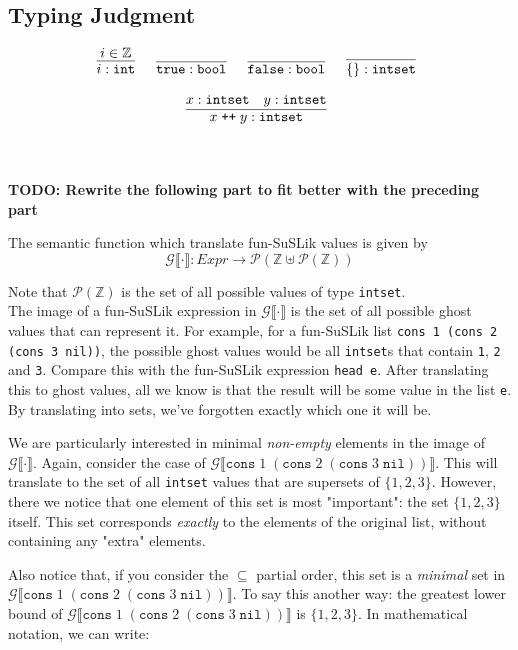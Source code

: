 \documentclass[10pt]{article}
\newcommand{\ttt}[1]{\texttt{#1}}
\newcommand{\ra}{\ensuremath{\rightarrow}}
\newcommand{\cons}{\ttt{cons}}
\newcommand{\nil}{\ttt{nil}}
\newcommand{\intS}{\ttt{int}}
\newcommand{\intset}{\ttt{intset}}
\newcommand{\bool}{\ttt{bool}}
\newcommand{\true}{\ttt{true}}
\newcommand{\false}{\ttt{false}}
\newcommand{\labinfer} [3] [] {\infer[{\small\textsc{#1}}]{#2}{#3}}
\newcommand{\sem} [1] {\llbracket#1\rrbracket}
\newcommand{\Gsem} [1] {\mathcal{G}\sem{#1}}
\begin{document}
\subsection{Typing Judgment}
\[
  \begin{array}{cc}
    \labinfer{i : \intS}{i \in \mathbb{Z}}
    ~~~
    \labinfer{\true : \bool}{}
    ~~~
    \labinfer{\false : \bool}{}
    ~~~
    \labinfer{\{\} : \intset}{}
    \\\\
    \labinfer{x\; \ttt{++}\; y : \intset}{x : \intset & y : \intset}

  \end{array}
\]

~\\\\
\textbf{TODO: Rewrite the following part to fit better with the preceding part}

\noindent
The semantic function which translate fun-SuSLik values is given by
\[
  \Gsem{\cdot} : Expr \ra \mathcal{P}(\mathbb{Z} \uplus \mathcal{P}(\mathbb{Z}))
\]

\noindent
Note that $\mathcal{P}(\mathbb{Z})$ is the set of all possible values of type \verb|intset|.\\

The image of a fun-SuSLik expression in $\Gsem{\cdot}$ is the
set of all possible ghost values that can represent it. For example, for a fun-SuSLik list \verb|cons 1 (cons 2 (cons 3 nil))|, the possible
ghost values would be all \verb|intset|s that contain \ttt{1}, \ttt{2} and \ttt{3}. Compare this with the fun-SuSLik expression
\verb|head e|. After translating this to ghost values, all we know is that the result will be some value in the
list \verb|e|. By translating into sets, we've forgotten exactly which one it will be.

We are particularly interested in minimal \textit{non-empty} elements in the image of
$\Gsem{\cdot}$. Again, consider the case of $\Gsem{\cons\; 1\; (\cons\; 2\; (\cons\; 3\; \nil))}$.
This will translate to the set of all \verb|intset| values that are supersets of $\{1,2,3\}$. However, there we notice that one
element of this set is most "important": the set $\{1,2,3\}$ itself. This set corresponds
\textit{exactly} to the elements of the original list, without containing any
"extra" elements.

Also notice that, if you consider the $\subseteq$ partial order,
this set is a \textit{minimal} set in $\Gsem{\cons\; 1\; (\cons\; 2\; (\cons\; 3\; \nil))}$. To say this another way:
the greatest lower bound of $\Gsem{\cons\; 1\; (\cons\; 2\; (\cons\; 3\; \nil))}$ is $\{1,2,3\}$. In mathematical notation,
we can write:
\end{document}
